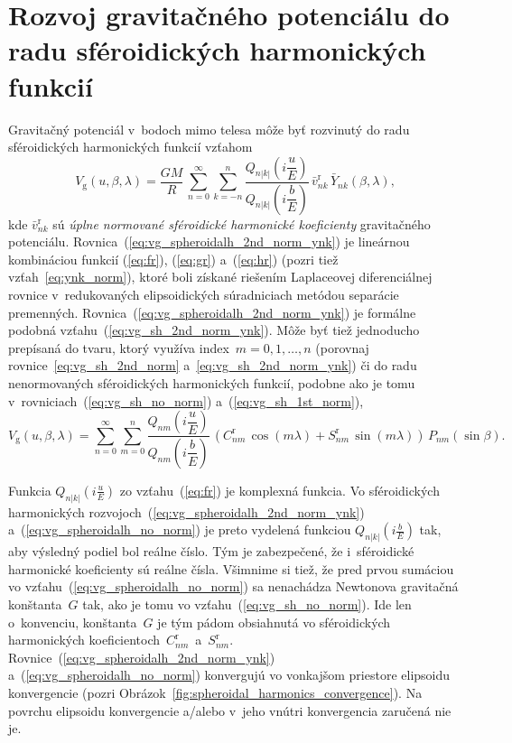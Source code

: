 \documentclass[a4paper, 12pt]{book}
\newcommand{\gidx}{\mathrm g}
\begin{document}
\section{Rozvoj gravitačného potenciálu do radu sféroidických harmonických 
funkcií}
\label{sec:spheroidal_harmonic_expansion}

Gravitačný potenciál v~bodoch mimo telesa môže byť rozvinutý do radu 
sféroidických harmonických funkcií vzťahom \parencite{MoritzPhysicalGeodesy}
%
\begin{equation}
\label{eq:vg_spheroidalh_2nd_norm_ynk}
V_\gidx(u, \beta, \lambda) = \frac{GM}{R} \, \sum_{n = 0}^\infty \sum_{k 
= -n}^n \frac{Q_{n|k|}\left( i \dfrac{u}{E} \right)}{Q_{n|k|}\left( 
i \dfrac{b}{E} \right)} \, \bar{v}^{\mathrm{r}}_{nk} \, \bar{Y}_{nk}(\beta, 
\lambda){,}
\end{equation}
%
kde $\bar{v}_{nk}^\mathrm{r}$ sú \emph{úplne normované sféroidické harmonické 
koeficienty} gravitačného potenciálu.  
Rovnica~(\ref{eq:vg_spheroidalh_2nd_norm_ynk}) je lineárnou kombináciou funkcií 
(\ref{eq:fr}), (\ref{eq:gr}) a~(\ref{eq:hr}) (pozri tiež 
vzťah~\ref{eq:ynk_norm}), ktoré boli získané riešením Laplaceovej 
diferenciálnej rovnice v~redukovaných elipsoidických súradniciach metódou 
separácie premenných.  Rovnica~(\ref{eq:vg_spheroidalh_2nd_norm_ynk}) je 
formálne podobná vzťahu~(\ref{eq:vg_sh_2nd_norm_ynk}).  Môže byť tiež 
jednoducho prepísaná do tvaru, ktorý využíva index~$m = 0, 1, \dots, n$ 
(porovnaj rovnice~\ref{eq:vg_sh_2nd_norm} a~\ref{eq:vg_sh_2nd_norm_ynk}) či do 
radu nenormovaných sféroidických harmonických funkcií, podobne ako je tomu 
v~rovniciach~(\ref{eq:vg_sh_no_norm}) a~(\ref{eq:vg_sh_1st_norm}),
%
\begin{equation}
\label{eq:vg_spheroidalh_no_norm}
V_\gidx(u, \beta, \lambda) = \sum_{n = 0}^\infty \sum_{m = 0}^n 
\frac{Q_{nm}\left( i \dfrac{u}{E} \right)}{Q_{nm}\left( i \dfrac{b}{E} \right)} 
\, \left( C^{\mathrm{r}}_{nm} \, \cos(m\lambda) + S^{\mathrm{r}}_{nm} \, 
\sin(m\lambda) \right) \, P_{nm}(\sin\beta){.}
\end{equation}

Funkcia $Q_{n|k|}\left( i \frac{u}{E} \right)$ zo vzťahu~(\ref{eq:fr}) je 
komplexná funkcia.  Vo sféroidických harmonických 
rozvojoch~(\ref{eq:vg_spheroidalh_2nd_norm_ynk}) 
a~(\ref{eq:vg_spheroidalh_no_norm}) je preto vydelená funkciou $Q_{n|k|}\left( 
i \frac{b}{E} \right)$ tak, aby výsledný podiel bol reálne číslo.  Tým je 
zabezpečené, že i~sféroidické harmonické koeficienty sú reálne čísla.  Všimnime 
si tiež, že pred prvou sumáciou vo vzťahu~(\ref{eq:vg_spheroidalh_no_norm}) sa 
nenachádza Newtonova gravitačná konštanta~$G$ tak, ako je tomu vo 
vzťahu~(\ref{eq:vg_sh_no_norm}).  Ide len o~konvenciu, konštanta~$G$ je tým 
pádom obsiahnutá vo sféroidických harmonických 
koeficientoch~$C_{nm}^\mathrm{r}$~a~$S_{nm}^\mathrm{r}$.  
Rovnice~(\ref{eq:vg_spheroidalh_2nd_norm_ynk}) 
a~(\ref{eq:vg_spheroidalh_no_norm}) konvergujú vo vonkajšom priestore elipsoidu 
konvergencie (pozri Obrázok~\ref{fig:spheroidal_harmonics_convergence}).  Na 
povrchu elipsoidu konvergencie a/alebo v~jeho vnútri konvergencia zaručená nie 
je.
\end{document}
